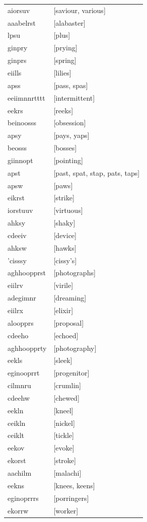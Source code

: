 \documentclass{article}
\begin{document}
\begin{tabular}{ll}
aiorsuv & [saviour, various] \\
aaabelrst & [alabaster] \\
lpsu & [plus] \\
ginpry & [prying] \\
ginprs & [spring] \\
eiills & [lilies] \\
apss & [pass, spas] \\
eeiimnnrtttt & [intermittent] \\
eekrs & [reeks] \\
beinoosss & [obsession] \\
apsy & [pays, yaps] \\
beosss & [bosses] \\
giinnopt & [pointing] \\
apst & [past, spat, stap, pats, taps] \\
apsw & [paws] \\
eikrst & [strike] \\
iorstuuv & [virtuous] \\
ahksy & [shaky] \\
cdeeiv & [device] \\
ahksw & [hawks] \\
'cisssy & [cissy's] \\
aghhoopprst & [photographs] \\
eiilrv & [virile] \\
adegimnr & [dreaming] \\
eiilrx & [elixir] \\
aloopprs & [proposal] \\
cdeeho & [echoed] \\
aghhoopprty & [photography] \\
eekls & [sleek] \\
eginooprrt & [progenitor] \\
cilmnru & [crumlin] \\
cdeehw & [chewed] \\
eekln & [kneel] \\
ceikln & [nickel] \\
ceiklt & [tickle] \\
eekov & [evoke] \\
ekorst & [stroke] \\
aachilm & [malachi] \\
eekns & [knees, keens] \\
eginoprrrs & [porringers] \\
ekorrw & [worker] \\

\end{tabular}
\end{document}
